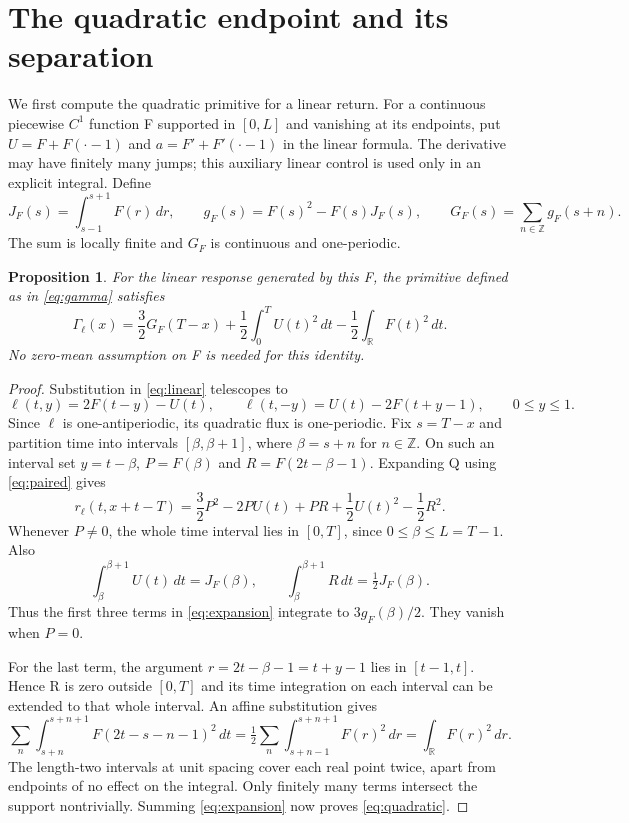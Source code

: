 \documentclass[11pt]{article}
\newtheorem{proposition}[theorem]{Proposition}
\begin{document}
\section{The quadratic endpoint and its separation}
We first compute the quadratic primitive for a linear return. For a continuous
piecewise $C^1$ function F supported in $[0,L]$ and vanishing at its endpoints,
put $U=F+F(\cdot-1)$ and $a=F'+F'(\cdot-1)$ in the linear formula. The
derivative may have finitely many jumps; this auxiliary linear control is
used only in an explicit integral. Define
\begin{equation}\label{eq:G}
J_F(s)=\int_{s-1}^{s+1}F(r)\,dr,\qquad
g_F(s)=F(s)^2-F(s)J_F(s),\qquad
G_F(s)=\sum_{n\in\mathbb Z}g_F(s+n).
\end{equation}
The sum is locally finite and $G_F$ is continuous and one-periodic.

\begin{proposition}\label{prop:quadratic}
For the linear response generated by this F, the primitive defined as in
\eqref{eq:gamma} satisfies
\begin{equation}\label{eq:quadratic}
\Gamma_\ell(x)=\frac32G_F(T-x)
 +\frac12\int_0^T U(t)^2\,dt-\frac12\int_{\mathbb R}F(t)^2\,dt.
\end{equation}
No zero-mean assumption on F is needed for this identity.
\end{proposition}
\begin{proof}
Substitution in \eqref{eq:linear} telescopes to
\begin{equation}\label{eq:paired}
\ell(t,y)=2F(t-y)-U(t),\qquad
\ell(t,-y)=U(t)-2F(t+y-1),\qquad0\le y\le1.
\end{equation}
Since $\ell$ is one-antiperiodic, its quadratic flux is one-periodic. Fix
$s=T-x$ and partition time into intervals $[\beta,\beta+1]$, where
$\beta=s+n$ for $n\in\mathbb Z$. On such an interval set
$y=t-\beta$, $P=F(\beta)$ and $R=F(2t-\beta-1)$. Expanding Q using
\eqref{eq:paired} gives
\begin{equation}\label{eq:expansion}
r_\ell(t,x+t-T)
=\frac32P^2-2PU(t)+PR+\frac12U(t)^2-\frac12R^2.
\end{equation}
Whenever $P\ne0$, the whole time interval lies in $[0,T]$, since
$0\le\beta\le L=T-1$. Also
\[
\int_\beta^{\beta+1}U(t)\,dt=J_F(\beta),\qquad
\int_\beta^{\beta+1}R\,dt=\tfrac12J_F(\beta).
\]
Thus the first three terms in \eqref{eq:expansion} integrate to
$3g_F(\beta)/2$. They vanish when $P=0$.

For the last term, the argument $r=2t-\beta-1=t+y-1$ lies in $[t-1,t]$.
Hence R is zero outside $[0,T]$ and its time integration on each interval
can be extended to that whole interval. An affine substitution gives
\[
\sum_n\int_{s+n}^{s+n+1}F(2t-s-n-1)^2\,dt
=\tfrac12\sum_n\int_{s+n-1}^{s+n+1}F(r)^2\,dr
=\int_{\mathbb R}F(r)^2\,dr.
\]
The length-two intervals at unit spacing cover each real point twice,
apart from endpoints of no effect on the integral. Only finitely many terms
intersect the support nontrivially. Summing \eqref{eq:expansion} now proves
\eqref{eq:quadratic}.
\end{proof}
\end{document}
